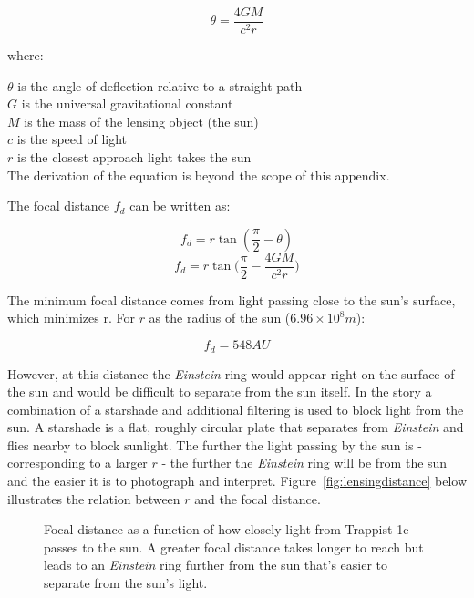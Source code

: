 \documentclass[12pt]{article} %
\begin{document}
$$\theta = \frac{4GM}{c^2r}$$

where:

$\theta$ is the angle of deflection relative to a straight path\\
$G$ is the universal gravitational constant\\
$M$ is the mass of the lensing object (the sun)\\
$c$ is the speed of light\\
$r$ is the closest approach light takes the sun\\

The derivation of the equation is beyond the scope of this appendix.

The focal distance $f_d$ can be written as:

$$f_d = r\tan (\frac{\pi}{2} - \theta)$$
$$f_d = r\tan\bigg(\frac{\pi}{2} - \frac{4GM}{c^2r}\bigg)$$

The minimum focal distance comes from light passing close to the sun's surface, which minimizes r. For $r$ as the radius of the sun ($6.96 \times 10^8 m$):

$$f_d =  548AU$$

However, at this distance the \textit{Einstein} ring would appear right on the surface of the sun and would be difficult to separate from the sun itself. In the story a combination of a starshade and additional filtering is used to block light from the sun. A starshade is a flat, roughly circular plate that separates from \textit{Einstein} and flies nearby to block sunlight. The further the light passing by the sun is - corresponding to a larger $r$ - the further the \textit{Einstein} ring will be from the sun and the easier it is to photograph and interpret. Figure~\ref{fig:lensingdistance} below illustrates the relation between $r$ and the focal distance. 

\begin{figure}[H]
	\caption{Focal distance as a function of how closely light from Trappist-1e passes to the sun. A greater focal distance takes longer to reach but leads to an \textit{Einstein} ring further from the sun that's easier to separate from the sun's light.}
\end{figure}
\end{document}

